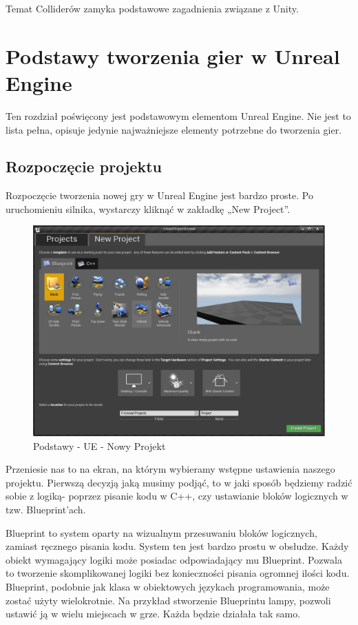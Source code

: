 \documentclass[openright]{xmgr}
\begin{document}
Temat Colliderów zamyka podstawowe zagadnienia związane z Unity.

\chapter{Podstawy tworzenia gier w Unreal Engine}

Ten rozdział poświęcony jest podstawowym elementom Unreal Engine. Nie jest to lista pełna, opisuje jedynie najważniejsze elementy potrzebne do tworzenia gier.

\section{Rozpoczęcie projektu}

Rozpoczęcie tworzenia nowej gry w Unreal Engine jest bardzo proste. Po uruchomieniu silnika, wystarczy kliknąć w zakładkę „New Project”.

\begin{figure}[!htb]
    \begin{center}
    \includegraphics[scale=0.35]{Screeny/New_project}
    \end{center}
    \caption{Podstawy - UE - Nowy Projekt}
\end{figure}

Przeniesie nas to na ekran, na którym wybieramy wstępne ustawienia naszego projektu. Pierwszą decyzją jaką musimy podjąć, to w jaki sposób będziemy radzić sobie z logiką- poprzez pisanie kodu w C++, czy ustawianie bloków logicznych w tzw. Blueprint’ach.

Blueprint to system oparty na wizualnym przesuwaniu bloków logicznych, zamiast ręcznego pisania kodu. System ten jest bardzo prostu w obsłudze. Każdy obiekt wymagający logiki może posiadac odpowiadający mu Blueprint. Pozwala to tworzenie skomplikowanej logiki bez konieczności pisania ogromnej ilości kodu. Blueprint, podobnie jak klasa w obiektowych językach programowania, może zostać użyty wielokrotnie. Na przykład stworzenie Blueprintu lampy, pozwoli ustawić ją w wielu miejscach w grze. Każda będzie działała tak samo.
\end{document}

